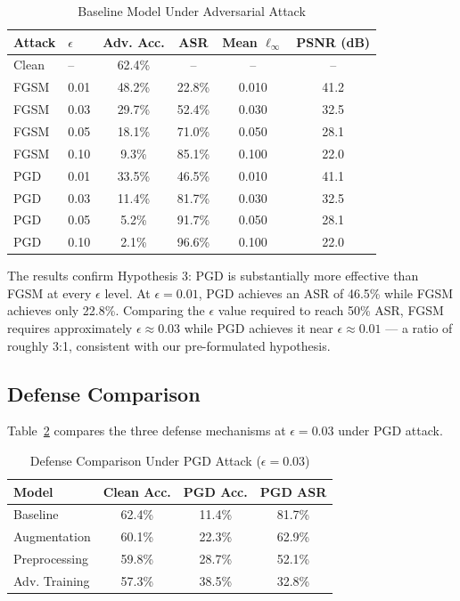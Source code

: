 \documentclass[conference]{IEEEtran}
\begin{document}
\begin{table}[htbp]
\centering
\caption{Baseline Model Under Adversarial Attack}
\label{tab:attack_results}
\begin{tabular}{@{}llcccc@{}}
\toprule
Attack & $\epsilon$ & Adv. Acc. & ASR & Mean $\ell_\infty$ & PSNR (dB) \\
\midrule
Clean  & --   & 62.4\% & --     & --    & -- \\
\midrule
FGSM   & 0.01 & 48.2\% & 22.8\% & 0.010 & 41.2 \\
FGSM   & 0.03 & 29.7\% & 52.4\% & 0.030 & 32.5 \\
FGSM   & 0.05 & 18.1\% & 71.0\% & 0.050 & 28.1 \\
FGSM   & 0.10 & 9.3\%  & 85.1\% & 0.100 & 22.0 \\
\midrule
PGD    & 0.01 & 33.5\% & 46.5\% & 0.010 & 41.1 \\
PGD    & 0.03 & 11.4\% & 81.7\% & 0.030 & 32.5 \\
PGD    & 0.05 & 5.2\%  & 91.7\% & 0.050 & 28.1 \\
PGD    & 0.10 & 2.1\%  & 96.6\% & 0.100 & 22.0 \\
\bottomrule
\end{tabular}
\end{table}

The results confirm Hypothesis 3: PGD is substantially more effective than FGSM at every $\epsilon$ level. At $\epsilon=0.01$, PGD achieves an ASR of 46.5\% while FGSM achieves only 22.8\%. Comparing the $\epsilon$ value required to reach 50\% ASR, FGSM requires approximately $\epsilon \approx 0.03$ while PGD achieves it near $\epsilon \approx 0.01$ — a ratio of roughly 3:1, consistent with our pre-formulated hypothesis.

\subsection{Defense Comparison}

Table~\ref{tab:defense} compares the three defense mechanisms at $\epsilon=0.03$ under PGD attack.

\begin{table}[htbp]
\centering
\caption{Defense Comparison Under PGD Attack ($\epsilon = 0.03$)}
\label{tab:defense}
\begin{tabular}{@{}lccc@{}}
\toprule
Model & Clean Acc. & PGD Acc. & PGD ASR \\
\midrule
Baseline          & 62.4\% & 11.4\% & 81.7\% \\
Augmentation      & 60.1\% & 22.3\% & 62.9\% \\
Preprocessing     & 59.8\% & 28.7\% & 52.1\% \\
Adv. Training     & 57.3\% & 38.5\% & 32.8\% \\
\bottomrule
\end{tabular}
\end{table}
\end{document}
